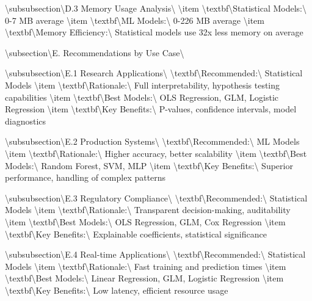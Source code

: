 \documentclass[11pt,a4paper]{article}
\begin{document}
\textbackslash{}subsubsection\textbackslash{}{D.3 Memory Usage Analysis\textbackslash{}}
\textbackslash{}item \textbackslash{}textbf\textbackslash{}{Statistical Models:\textbackslash{}} 0-7 MB average
\textbackslash{}item \textbackslash{}textbf\textbackslash{}{ML Models:\textbackslash{}} 0-226 MB average
\textbackslash{}item \textbackslash{}textbf\textbackslash{}{Memory Efficiency:\textbackslash{}} Statistical models use 32x less memory on average

\textbackslash{}subsection\textbackslash{}{E. Recommendations by Use Case\textbackslash{}}

\textbackslash{}subsubsection\textbackslash{}{E.1 Research Applications\textbackslash{}}
\textbackslash{}textbf\textbackslash{}{Recommended:\textbackslash{}} Statistical Models
\textbackslash{}item \textbackslash{}textbf\textbackslash{}{Rationale:\textbackslash{}} Full interpretability, hypothesis testing capabilities
\textbackslash{}item \textbackslash{}textbf\textbackslash{}{Best Models:\textbackslash{}} OLS Regression, GLM, Logistic Regression
\textbackslash{}item \textbackslash{}textbf\textbackslash{}{Key Benefits:\textbackslash{}} P-values, confidence intervals, model diagnostics

\textbackslash{}subsubsection\textbackslash{}{E.2 Production Systems\textbackslash{}}
\textbackslash{}textbf\textbackslash{}{Recommended:\textbackslash{}} ML Models
\textbackslash{}item \textbackslash{}textbf\textbackslash{}{Rationale:\textbackslash{}} Higher accuracy, better scalability
\textbackslash{}item \textbackslash{}textbf\textbackslash{}{Best Models:\textbackslash{}} Random Forest, SVM, MLP
\textbackslash{}item \textbackslash{}textbf\textbackslash{}{Key Benefits:\textbackslash{}} Superior performance, handling of complex patterns

\textbackslash{}subsubsection\textbackslash{}{E.3 Regulatory Compliance\textbackslash{}}
\textbackslash{}textbf\textbackslash{}{Recommended:\textbackslash{}} Statistical Models
\textbackslash{}item \textbackslash{}textbf\textbackslash{}{Rationale:\textbackslash{}} Transparent decision-making, auditability
\textbackslash{}item \textbackslash{}textbf\textbackslash{}{Best Models:\textbackslash{}} OLS Regression, GLM, Cox Regression
\textbackslash{}item \textbackslash{}textbf\textbackslash{}{Key Benefits:\textbackslash{}} Explainable coefficients, statistical significance

\textbackslash{}subsubsection\textbackslash{}{E.4 Real-time Applications\textbackslash{}}
\textbackslash{}textbf\textbackslash{}{Recommended:\textbackslash{}} Statistical Models
\textbackslash{}item \textbackslash{}textbf\textbackslash{}{Rationale:\textbackslash{}} Fast training and prediction times
\textbackslash{}item \textbackslash{}textbf\textbackslash{}{Best Models:\textbackslash{}} Linear Regression, GLM, Logistic Regression
\textbackslash{}item \textbackslash{}textbf\textbackslash{}{Key Benefits:\textbackslash{}} Low latency, efficient resource usage
\end{document}

